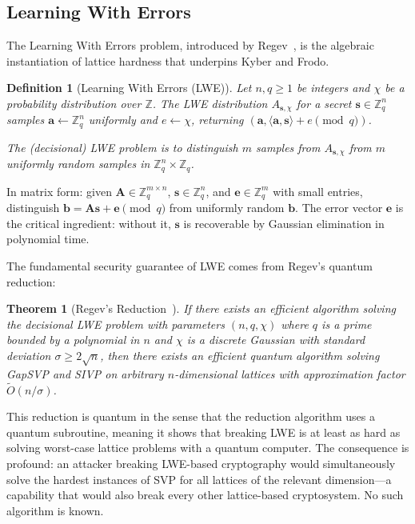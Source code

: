 \documentclass[12pt,a4paper]{report}
\newtheorem{definition}{Definition}[chapter]
\newtheorem{theorem}{Theorem}[chapter]
\begin{document}
\subsection{Learning With Errors}

The Learning With Errors problem, introduced by Regev~\cite{regev2005}, is the
algebraic instantiation of lattice hardness that underpins Kyber and Frodo.

\begin{definition}[Learning With Errors (LWE)]
Let $n, q \geq 1$ be integers and $\chi$ be a probability distribution over $\mathbb{Z}$.
The LWE distribution $A_{\mathbf{s},\chi}$ for a secret $\mathbf{s} \in \mathbb{Z}_q^n$
samples $\mathbf{a} \leftarrow \mathbb{Z}_q^n$ uniformly and $e \leftarrow \chi$,
returning $(\mathbf{a}, \langle \mathbf{a}, \mathbf{s} \rangle + e \pmod{q})$.

The (decisional) LWE problem is to distinguish $m$ samples from $A_{\mathbf{s},\chi}$
from $m$ uniformly random samples in $\mathbb{Z}_q^n \times \mathbb{Z}_q$.
\end{definition}

In matrix form: given $\mathbf{A} \in \mathbb{Z}_q^{m \times n}$,
$\mathbf{s} \in \mathbb{Z}_q^n$, and $\mathbf{e} \in \mathbb{Z}_q^m$ with small entries,
distinguish $\mathbf{b} = \mathbf{A}\mathbf{s} + \mathbf{e} \pmod{q}$ from uniformly
random $\mathbf{b}$. The error vector $\mathbf{e}$ is the critical ingredient:
without it, $\mathbf{s}$ is recoverable by Gaussian elimination in polynomial time.

The fundamental security guarantee of LWE comes from Regev's quantum reduction:

\begin{theorem}[Regev's Reduction~\cite{regev2005}]
If there exists an efficient algorithm solving the decisional LWE problem with
parameters $(n, q, \chi)$ where $q$ is a prime bounded by a polynomial in $n$ and
$\chi$ is a discrete Gaussian with standard deviation $\sigma \geq 2\sqrt{n}$, then
there exists an efficient quantum algorithm solving GapSVP and SIVP on arbitrary
$n$-dimensional lattices with approximation factor $\tilde{O}(n/\sigma)$.
\end{theorem}

This reduction is quantum in the sense that the reduction algorithm uses a quantum
subroutine, meaning it shows that breaking LWE is at least as hard as solving
worst-case lattice problems with a quantum computer. The consequence is profound:
an attacker breaking LWE-based cryptography would simultaneously solve the hardest
instances of SVP for all lattices of the relevant dimension---a capability that would
also break every other lattice-based cryptosystem. No such algorithm is known.
\end{document}
